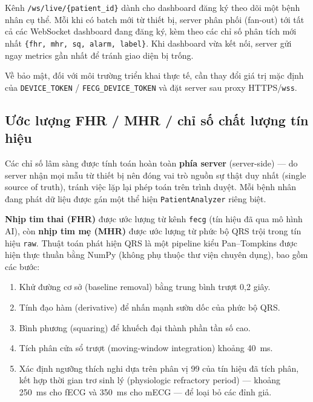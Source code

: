 \documentclass[../DoAn.tex]{subfiles}
\begin{document}
Kênh \texttt{/ws/live/\{patient\_id\}} dành cho dashboard đăng ký theo dõi một bệnh nhân cụ thể. Mỗi khi có batch mới từ thiết bị, server phân phối (fan-out) tới tất cả các WebSocket dashboard đang đăng ký, kèm theo các chỉ số phân tích mới nhất \texttt{\{fhr, mhr, sq, alarm, label\}}. Khi dashboard vừa kết nối, server gửi ngay metrics gần nhất để tránh giao diện bị trống.

Về bảo mật, đối với môi trường triển khai thực tế, cần thay đổi giá trị mặc định của \texttt{DEVICE\_TOKEN} / \texttt{FECG\_DEVICE\_TOKEN} và đặt server sau proxy HTTPS/\texttt{wss}.

\subsection{Ước lượng FHR / MHR / chỉ số chất lượng tín hiệu}

Các chỉ số lâm sàng được tính toán hoàn toàn \textbf{phía server} (server-side) --- do server nhận mọi mẫu từ thiết bị nên đóng vai trò nguồn sự thật duy nhất (single source of truth), tránh việc lặp lại phép toán trên trình duyệt. Mỗi bệnh nhân đang phát dữ liệu được gán một thể hiện \texttt{PatientAnalyzer} riêng biệt.

\textbf{Nhịp tim thai (FHR)} được ước lượng từ kênh \texttt{fecg} (tín hiệu đã qua mô hình AI), còn \textbf{nhịp tim mẹ (MHR)} được ước lượng từ phức bộ QRS trội trong tín hiệu \texttt{raw}. Thuật toán phát hiện QRS là một pipeline kiểu Pan--Tompkins được hiện thực thuần bằng NumPy (không phụ thuộc thư viện chuyên dụng), bao gồm các bước:

\begin{enumerate}
  \item Khử đường cơ sở (baseline removal) bằng trung bình trượt 0{,}2 giây.
  \item Tính đạo hàm (derivative) để nhấn mạnh sườn dốc của phức bộ QRS.
  \item Bình phương (squaring) để khuếch đại thành phần tần số cao.
  \item Tích phân cửa sổ trượt (moving-window integration) khoảng 40~ms.
  \item Xác định ngưỡng thích nghi dựa trên phân vị 99 của tín hiệu đã tích phân, kết hợp thời gian trơ sinh lý (physiologic refractory period) --- khoảng 250~ms cho fECG và 350~ms cho mECG --- để loại bỏ các đỉnh giả.
\end{enumerate}
\end{document}
